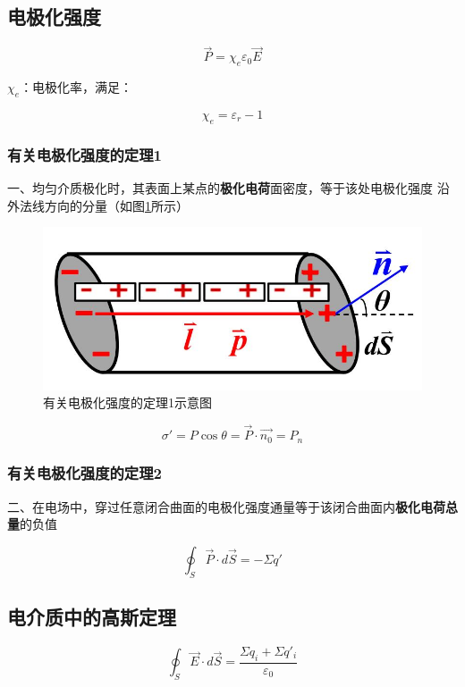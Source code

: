 \documentclass{ctexart}
\begin{document}
\subsection{电极化强度}

$$\vec{P}=\chi_e \varepsilon_0 \vec{E}$$

$\chi_e$：电极化率，满足：

$$\chi_e=\varepsilon_r-1$$

\subsubsection{有关电极化强度的定理1}

一、均匀介质极化时，其表面上某点的\textbf{极化电荷}面密度，等于该处电极化强度
沿外法线方向的分量（如图\ref{figure11.1}所示）

\begin{figure}[h]
	\centering
	\includegraphics[scale=0.4]{images//chapter_11//figure_11.1.jpg} 
	\caption{有关电极化强度的定理1示意图}\label{figure11.1}
\end{figure}

$$\sigma' =P\cos \theta =\vec{P}\cdot \vec{n_0}=P_n$$

\subsubsection{有关电极化强度的定理2}

二、在电场中，穿过任意闭合曲面的电极化强度通量等于该闭合曲面内\textbf{极化电荷总量}的负值

$$\oint_{S}\vec{P}\cdot d\vec{S}=-\Sigma q' $$

\subsection{电介质中的高斯定理}

$$\oint_{S}\vec{E}\cdot d\vec{S}=\frac{\Sigma q_i+\Sigma q'_i}{\varepsilon_0}$$
\end{document}

